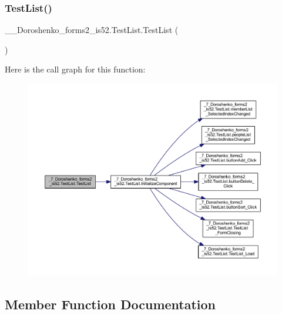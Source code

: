\subsubsection{\texorpdfstring{Test\+List()}{TestList()}}
{\footnotesize\ttfamily \+\_\+\_\+\+Doroshenko\+\_\+forms2\+\_\+is52.\+Test\+List.\+Test\+List (\begin{DoxyParamCaption}{ }\end{DoxyParamCaption})}

Here is the call graph for this function\+:
\nopagebreak
\begin{figure}[H]
\begin{center}
\leavevmode
\includegraphics[width=350pt]{class__7___doroshenko__forms2__is52_1_1_test_list_a5190182621fe4b4acb79b2dfabf0a236_cgraph}
\end{center}
\end{figure}


\subsection{Member Function Documentation}
\hypertarget{class__7___doroshenko__forms2__is52_1_1_test_list_a87ffd4c72f84d90e75d20bd62f0ee4f7}{}\label{class__7___doroshenko__forms2__is52_1_1_test_list_a87ffd4c72f84d90e75d20bd62f0ee4f7} 
